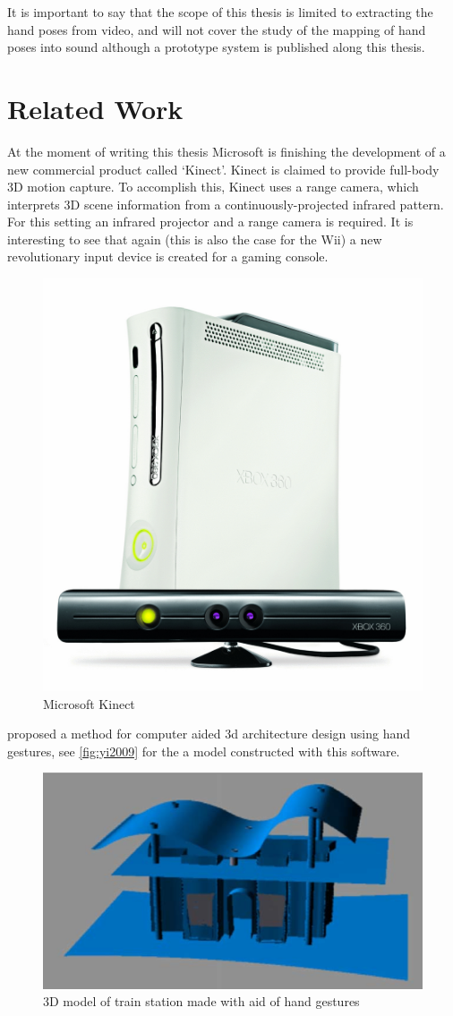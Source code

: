 It is important to say that the scope of this thesis is limited to extracting the hand poses from video, and will not cover the study of the mapping of hand poses into sound although a prototype system is published along this thesis.


\section{Related Work}
At the moment of writing this thesis Microsoft is finishing the development of a new commercial product called `Kinect'. Kinect is claimed to provide full-body 3D motion capture. To accomplish this, Kinect uses a range camera, which interprets 3D scene information from a continuously-projected infrared pattern. For this setting an infrared projector and a range camera is required. It is interesting to see that again (this is also the case for the Wii) a new revolutionary input device is created for a gaming console. 

\begin{figure}[tb]
	\center{}
	\includegraphics[width=0.3\linewidth]{figures/wave.jpg}
	\caption{Microsoft Kinect}
	\label{fig:kinect}
\end{figure}

\citep{Yi2009} proposed a method for computer aided 3d architecture design using hand gestures, see \autoref{fig:yi2009} for the a model constructed with this software.

\begin{figure}[tb]
	\center{}
	\includegraphics[width=0.6\linewidth]{figures/yi2009.png}
	\caption{3D model of train station made with aid of hand gestures}
	\label{fig:yi2009}
\end{figure}





